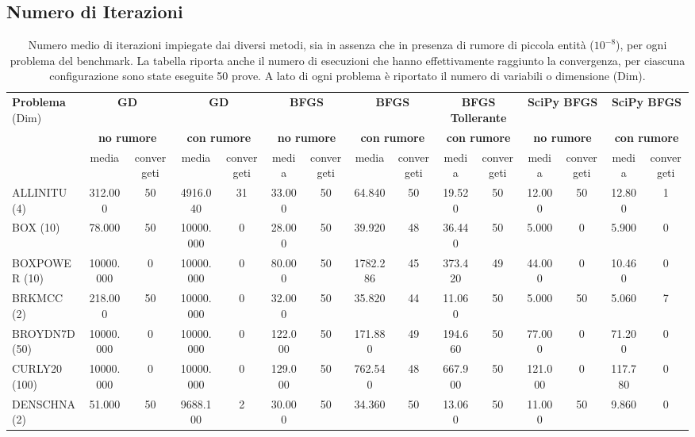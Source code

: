 \subsection{Numero di Iterazioni}
\begin{table}
    \scriptsize
    \caption{Numero medio di iterazioni impiegate dai diversi metodi, sia in assenza che in presenza di rumore di piccola entità (\(10^{-8}\)), per ogni problema del benchmark. La tabella riporta anche il numero di esecuzioni che hanno effettivamente raggiunto la convergenza, per ciascuna configurazione sono state eseguite 50 prove. A lato di ogni problema è riportato il numero di variabili o dimensione (Dim).}\label{tab:iterazioni_rumore_piccolo}
    \centering
    \begin{tabular}{lcccccccccccccc}
    \toprule
    \multirow{2}{*}{\textbf{Problema} (Dim)} & \multicolumn{2}{c}{\textbf{GD}} & \multicolumn{2}{c}{\textbf{GD}} & \multicolumn{2}{c}{\textbf{BFGS}} & \multicolumn{2}{c}{\textbf{BFGS}} & \multicolumn{2}{c}{\textbf{BFGS Tollerante}} & \multicolumn{2}{c}{\textbf{SciPy BFGS}} & \multicolumn{2}{c}{\textbf{SciPy BFGS}} \\
                                       & \multicolumn{2}{c}{\textbf{no rumore}} & \multicolumn{2}{c}{\textbf{con rumore}} & \multicolumn{2}{c}{\textbf{no rumore}} & \multicolumn{2}{c}{\textbf{con rumore}} & \multicolumn{2}{c}{\textbf{con rumore}} & \multicolumn{2}{c}{\textbf{no rumore}} & \multicolumn{2}{c}{\textbf{con rumore}} \\[1ex]
                                       & media & convergeti & media & convergeti & media & convergeti & media & convergeti & media & convergeti & media & convergeti & media & convergeti \\
    \midrule
    ALLINITU (4)  & 312.000   & 50 & 4916.040  & 31 & 33.000  & 50 & 64.840   & 50 & 19.520  & 50 & 12.000  & 50 & 12.800  & 1 \\[1ex]
    BOX (10)      & 78.000    & 50 & 10000.000 & 0  & 28.000  & 50 & 39.920   & 48 & 36.440  & 50 & 5.000   & 0  & 5.900   & 0 \\[1ex]
    BOXPOWER (10) & 10000.000 & 0  & 10000.000 & 0  & 80.000  & 50 & 1782.286 & 45 & 373.420 & 49 & 44.000  & 0  & 10.460  & 0 \\[1ex]
    BRKMCC (2)    & 218.000   & 50 & 10000.000 & 0  & 32.000  & 50 & 35.820   & 44 & 11.060  & 50 & 5.000   & 50 & 5.060   & 7 \\[1ex]
    BROYDN7D (50) & 10000.000 & 0  & 10000.000 & 0  & 122.000 & 50 & 171.880  & 49 & 194.660 & 50 & 77.000  & 0  & 71.200  & 0 \\[1ex]
    CURLY20 (100) & 10000.000 & 0  & 10000.000 & 0  & 129.000 & 50 & 762.540  & 48 & 667.900 & 50 & 121.000 & 0  & 117.780 & 0 \\[1ex]
    DENSCHNA (2)  & 51.000    & 50 & 9688.100  & 2  & 30.000  & 50 & 34.360   & 50 & 13.060  & 50 & 11.000  & 50 & 9.860   & 0 \\
    \bottomrule
    \end{tabular}
    
\end{table}
